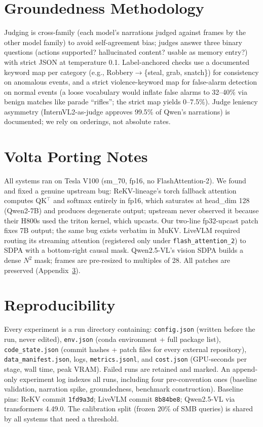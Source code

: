 \section{Groundedness Methodology}
\label{app:grounded}

Judging is cross-family (each model's narrations judged against frames by the other model family) to avoid self-agreement bias; judges answer three binary questions (actions supported? hallucinated content? usable as memory entry?) with strict JSON at temperature 0.1. Label-anchored checks use a documented keyword map per category (e.g., Robbery$\to$\{steal, grab, snatch\}) for consistency on anomalous events, and a strict violence-keyword map for false-alarm detection on normal events (a loose vocabulary would inflate false alarms to 32--40\% via benign matches like parade ``rifles''; the strict map yields 0--7.5\%). Judge leniency asymmetry (InternVL2-as-judge approves 99.5\% of Qwen's narrations) is documented; we rely on orderings, not absolute rates.

\section{Volta Porting Notes}
\label{app:porting}

All systems ran on Tesla V100 (sm\_70, fp16, no FlashAttention-2). We found and fixed a genuine upstream bug: ReKV-lineage's torch fallback attention computes QK$^{\top}$ and softmax entirely in fp16, which saturates at head\_dim 128 (Qwen2-7B) and produces degenerate output; upstream never observed it because their H800s used the triton kernel, which upcasts. Our two-line fp32-upcast patch fixes 7B output; the same bug exists verbatim in MuKV. LiveVLM required routing its streaming attention (registered only under \texttt{flash\_attention\_2}) to SDPA with a bottom-right causal mask. Qwen2.5-VL's vision SDPA builds a dense $N^2$ mask; frames are pre-resized to multiples of 28. All patches are preserved (Appendix~\ref{app:repro}).

\section{Reproducibility}
\label{app:repro}

Every experiment is a run directory containing: \texttt{config.json} (written before the run, never edited), \texttt{env.json} (conda environment + full package list), \texttt{code\_state.json} (commit hashes + patch files for every external repository), \texttt{data\_manifest.json}, logs, \texttt{metrics.jsonl}, and \texttt{cost.json} (GPU-seconds per stage, wall time, peak VRAM). Failed runs are retained and marked. An append-only experiment log indexes all runs, including four pre-convention ones (baseline validation, narration spike, groundedness, benchmark construction). Baseline pins: ReKV commit \texttt{1fd9a3d}; LiveVLM commit \texttt{8b84be8}; Qwen2.5-VL via transformers 4.49.0. The calibration split (frozen 20\% of SMB queries) is shared by all systems that need a threshold.
